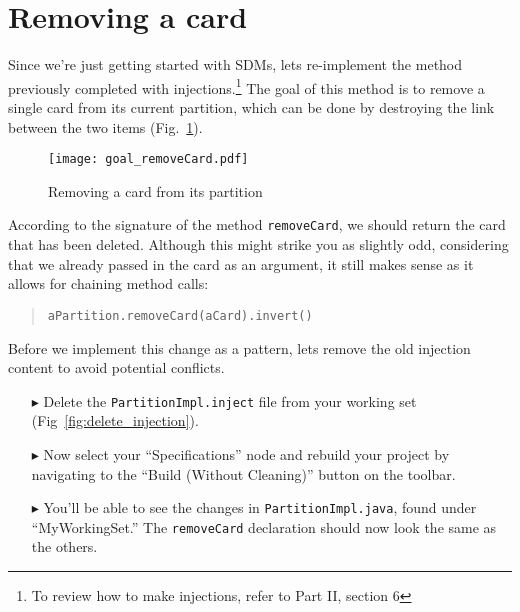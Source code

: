 \newpage
\genHeader
\section{Removing a card}
\hypertarget{sec:remCard}{}

Since we're just getting started with SDMs, lets re-implement the method previously completed with injections.\footnote{To review how to make
injections, refer to Part II, section 6} The goal of this method is to remove a single card from its current partition, which can be done by destroying the link
between the two items (Fig.~\ref{fig:goal_removeCard}).

\vspace{0.5cm}

\begin{figure}[htbp]
	\centering
    \texttt{[image: goal\_removeCard.pdf]}
	\caption{Removing a card from its partition}
	\label{fig:goal_removeCard}
\end{figure}
\FloatBarrier

\vspace{0.5cm}

According to the signature of the method \texttt{removeCard}, we should return the card that has been deleted. Although this might strike you as slightly odd,
considering that we already passed in the card as an argument, it still makes sense as it allows for chaining method calls:
\begin{quote}\texttt{aPartition.removeCard(aCard).invert()}\end{quote}

Before we implement this change as a pattern, lets remove the old injection content to avoid potential conflicts.

\begin{itemize}

\item[$\blacktriangleright$] Delete the \texttt{PartitionImpl.inject} file from your working set (Fig~\ref{fig:delete_injection}).

\item[$\blacktriangleright$] Now select your ``Specifications'' node and rebuild your project by navigating to the ``Build (Without Cleaning)'' button on the
toolbar.

\item[$\blacktriangleright$] You'll be able to see the changes in \texttt{PartitionImpl.java}, found under ``MyWorkingSet.'' The \texttt{removeCard}
declaration should now look the same as the others.

\end{itemize}

